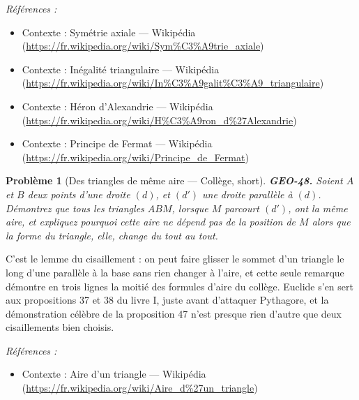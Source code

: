 \documentclass[11pt]{article}
\newtheorem{problem}{Problème}
\newenvironment{refs}{\par\small\noindent\emph{Références :}\begin{itemize}\setlength\itemsep{0pt}}{\end{itemize}\normalsize}
\begin{document}
\begin{refs}
\item Contexte : Symétrie axiale --- Wikipédia (\url{https://fr.wikipedia.org/wiki/Sym%C3%A9trie_axiale})
\item Contexte : Inégalité triangulaire --- Wikipédia (\url{https://fr.wikipedia.org/wiki/In%C3%A9galit%C3%A9_triangulaire})
\item Contexte : Héron d'Alexandrie --- Wikipédia (\url{https://fr.wikipedia.org/wiki/H%C3%A9ron_d%27Alexandrie})
\item Contexte : Principe de Fermat --- Wikipédia (\url{https://fr.wikipedia.org/wiki/Principe_de_Fermat})
\end{refs}

\bigskip

\begin{problem}[{Des triangles de même aire --- Collège, short}]
\textbf{GEO-48.} Soient $ A $ et $ B $ deux points d'une droite $ (d) $, et
$ (d') $ une droite parallèle à $ (d) $. Démontrez que tous les triangles $ ABM $, lorsque
$ M $ parcourt $ (d') $, ont la même aire, et expliquez pourquoi cette aire ne dépend pas de la
position de $ M $ alors que la forme du triangle, elle, change du tout au tout.
\end{problem}

\noindent C'est le lemme du \og{} cisaillement \fg{} : on peut faire glisser le sommet d'un triangle
le long d'une parallèle à la base sans rien changer à l'aire, et cette seule remarque démontre en trois
lignes la moitié des formules d'aire du collège. Euclide s'en sert aux propositions 37 et 38 du livre
I, juste avant d'attaquer Pythagore, et la démonstration célèbre de la proposition 47 n'est presque
rien d'autre que deux cisaillements bien choisis.

\begin{refs}
\item Contexte : Aire d'un triangle --- Wikipédia (\url{https://fr.wikipedia.org/wiki/Aire_d%27un_triangle})
\end{refs}

\bigskip
\end{document}
